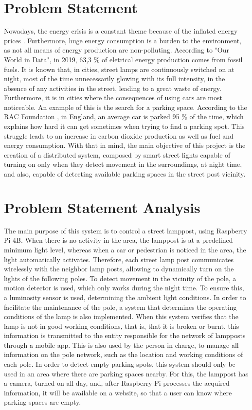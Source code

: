 \section{Problem Statement}
Nowadays, the energy crisis is a constant theme because of the inflated energy prices \cite{energy_crisis}. Furthermore, huge energy consumption is a burden to the environment, as not all means of energy production are non-polluting. According to "Our World in Data"\cite{owidenergy}, in 2019, 63,3 \% of eletrical energy production comes from fossil fuels. It is known that, in cities, street lamps are continuously switched on at night, most of the time unnecessarily glowing with its full intensity, in the absence of any activities in the street, leading to a great waste of energy. Furthermore, it is in cities where the consequences of using cars are most noticeable. An example of this is the search for a parking space. According to the RAC Foundation \cite{cars_parked}, in England, an average car is parked 95 \% of the time, which explains how hard it can get sometimes when trying to find a parking spot. This struggle leads to an increase in carbon dioxide production as well as fuel and energy consumption.
With that in mind, the main objective of this project is the creation of a  distributed system, composed by smart street lights capable of turning on only when they detect movement in the surroundings, at night time, and also, capable of detecting available parking spaces in the street post vicinity.

\section{Problem Statement Analysis}
The main purpose of this system is to control a street lamppost, using Raspberry Pi 4B. When there is no activity in the area, the lamppost is at a predefined minimum light level, whereas when a car or pedestrian is noticed in the area, the light automatically activates. Therefore, each street lamp post  communicates wirelessly with the neighbor lamp posts, allowing to dynamically turn on the lights of the following poles. To detect movement in the vicinity of the pole, a motion detector is used, which only works during the night time. To ensure this, a luminosity sensor is used, determining the ambient light conditions. In order to facilitate the maintenance of the pole, a system that determines the operating conditions of the lamp is also implemented. When this system verifies that the lamp is not in good working conditions, that is, that it is broken or burnt, this information is transmitted to the entity responsible for the network of lampposts through a mobile app. This is also used by the person in charge, to manage all information on the pole network, such as the location and working conditions of each pole. In order to detect empty parking spots, this system should only be used in an area where there are parking spaces nearby. For this, the lamppost has a camera, turned on all day, and, after Raspberry Pi processes the acquired information, it will be available on a website, so that a user can know where parking spaces are empty.